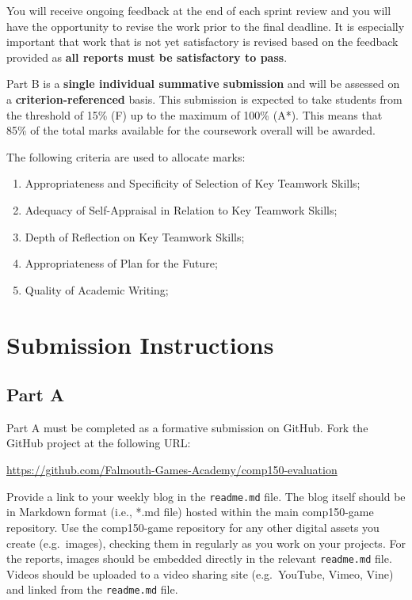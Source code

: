 \documentclass{../fal_assignment}
\begin{document}
You will receive ongoing feedback at the end of each sprint review and you will have the opportunity to revise the work prior to the final deadline. It is especially important that work that is not yet satisfactory is revised based on the feedback provided as \textbf{all reports must be satisfactory to pass}.

Part B is a \textbf{single individual summative submission} and will be assessed on a \textbf{criterion-referenced} basis. This submission is expected to take students from the threshold of 15\% (F) up to the maximum of 100\% (A*). This means that 85\% of the total marks available for the coursework overall will be awarded.

The following criteria are used to allocate marks:

\begin{enumerate}[label=(\alph*)]
	\item Appropriateness and Specificity of Selection of Key Teamwork Skills;
	\item Adequacy of Self-Appraisal in Relation to Key Teamwork Skills;
	\item Depth of Reflection on Key Teamwork Skills;
	\item Appropriateness of Plan for the Future;
	\item Quality of Academic Writing;
\end{enumerate}

\section*{Submission Instructions}

\subsection*{Part A}

Part A must be completed as a formative submission on GitHub. Fork the GitHub project at the following URL:

\indent \url{https://github.com/Falmouth-Games-Academy/comp150-evaluation}

Provide a link to your weekly blog in the \texttt{readme.md} file. The blog itself should be in Markdown format (i.e., *.md file) hosted within the main comp150-game repository. Use the comp150-game repository for any other digital assets you create (e.g.\ images), checking them in regularly as you work on your projects. For the reports, images should be embedded directly in the relevant \texttt{readme.md} file. Videos should be uploaded to a video sharing site (e.g.\ YouTube, Vimeo, Vine) and linked from the \texttt{readme.md} file.
\end{document}

